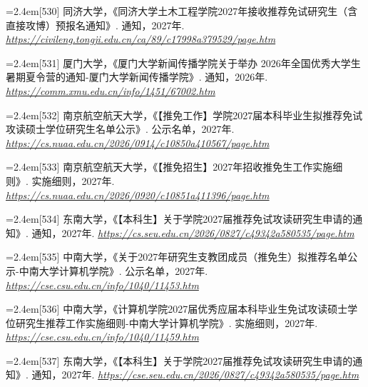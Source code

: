 {\par\noindent\hangindent=2.4em\label{src:S0099}{\color{cAccent}[530]} 同济大学，《同济大学土木工程学院2027年接收推荐免试研究生（含直接攻博）预报名通知》. 通知，2027年. \textit{\url{https://civileng.tongji.edu.cn/ca/89/c17998a379529/page.htm}}\par
\par\noindent\hangindent=2.4em\label{src:S0101}{\color{cAccent}[531]} 厦门大学，《厦门大学新闻传播学院关于举办 2026年全国优秀大学生暑期夏令营的通知-厦门大学新闻传播学院》. 通知，2026年. \textit{\url{https://comm.xmu.edu.cn/info/1451/67002.htm}}\par
\par\noindent\hangindent=2.4em\label{src:S0112}{\color{cAccent}[532]} 南京航空航天大学，《【推免工作】学院2027届本科毕业生拟推荐免试攻读硕士学位研究生名单公示》. 公示名单，2027年. \textit{\url{https://cs.nuaa.edu.cn/2026/0914/c10850a410567/page.htm}}\par
\par\noindent\hangindent=2.4em\label{src:S0113}{\color{cAccent}[533]} 南京航空航天大学，《【推免招生】2027年招收推免生工作实施细则》. 实施细则，2027年. \textit{\url{https://cs.nuaa.edu.cn/2026/0920/c10851a411396/page.htm}}\par
\par\noindent\hangindent=2.4em\label{src:S0115}{\color{cAccent}[534]} 东南大学，《【本科生】关于学院2027届推荐免试攻读研究生申请的通知》. 通知，2027年. \textit{\url{https://cs.seu.edu.cn/2026/0827/c49342a580535/page.htm}}\par
\par\noindent\hangindent=2.4em\label{src:S0122}{\color{cAccent}[535]} 中南大学，《关于2027年研究生支教团成员（推免生）拟推荐名单公示-中南大学计算机学院》. 公示名单，2027年. \textit{\url{https://cse.csu.edu.cn/info/1040/11453.htm}}\par
\par\noindent\hangindent=2.4em\label{src:S0123}{\color{cAccent}[536]} 中南大学，《计算机学院2027届优秀应届本科毕业生免试攻读硕士学位研究生推荐工作实施细则-中南大学计算机学院》. 实施细则，2027年. \textit{\url{https://cse.csu.edu.cn/info/1040/11459.htm}}\par
\par\noindent\hangindent=2.4em\label{src:S0128}{\color{cAccent}[537]} 东南大学，《【本科生】关于学院2027届推荐免试攻读研究生申请的通知》. 通知，2027年. \textit{\url{https://cse.seu.edu.cn/2026/0827/c49342a580535/page.htm}}\par
}
